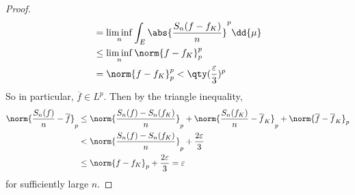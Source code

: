 \begin{proof}
\begin{align*}
		&= \liminf_n \int_E \abs{\frac{S_n(f - f_K)}{n}}^p \dd{\mu} \\
		&\leq \liminf_n \norm{f - f_K}_p^p \\
		&= \norm{f - f_K}_p^p < \qty(\frac{\varepsilon}{3})^p
	\end{align*}
	So in particular, $\overline f \in L^p$.
	Then by the triangle inequality,
	\begin{align*}
			\norm{\frac{S_n(f)}{n} - \overline f}_p &\leq \norm{\frac{S_n(f) - S_n(f_K)}{n}}_p + \norm{\frac{S_n(f_K)}{n} - \overline f_K}_p + \norm{\overline f - \overline f_K}_p \\
			&< \norm{\frac{S_n(f) - S_n(f_K)}{n}}_p + \frac{2\varepsilon}{3} \\
			&\leq \norm{f - f_K}_p + \frac{2\varepsilon}{3} = \varepsilon
	\end{align*}
	for sufficiently large $n$.
\end{proof}

